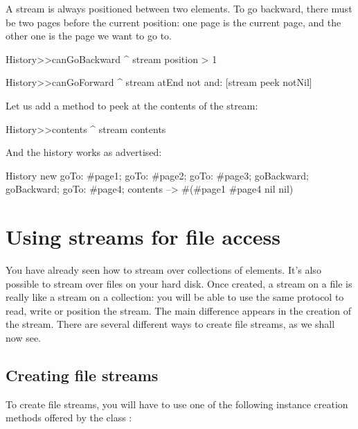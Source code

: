 \documentclass[a4paper,10pt,twoside]{book}
\begin{document}
A stream is always positioned between two elements. To go backward,
there must be two pages before the current position: one page is the
current page, and the other one is the page we want to go to.

\begin{code}{}
History>>canGoBackward
  ^ stream position > 1

History>>canGoForward
  ^ stream atEnd not and: [stream peek notNil]
\end{code}

Let us add a method to peek at the contents of the stream:
\begin{code}{}
History>>contents
  ^ stream contents
\end{code}

And the history works as advertised:
\begin{code}{}
History new
	goTo: #page1;
	goTo: #page2;
	goTo: #page3;
	goBackward;
	goBackward;
	goTo: #page4;
	contents --> #(#page1 #page4 nil nil)
\end{code}

\section{Using streams for file access}

You have already seen how to stream over collections of elements. It's
also possible to stream over files on your hard disk.
Once created, a stream on a file is really like a stream on a
collection: you will be able to use the same protocol to read, write
or position the stream.
The main difference appears in the creation of the stream.
There are several different ways to create file streams, as we shall now see.

\subsection{Creating file streams}

To create file streams, you will have to use one of the following
instance creation methods offered by the class :
\end{document}

